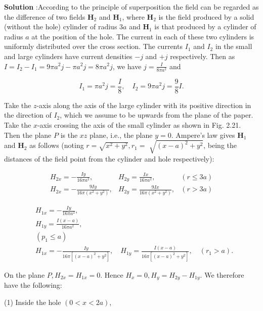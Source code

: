 \documentclass[10pt]{article}
\begin{document}
\textbf{Solution} :According to the principle of superposition the field can be regarded as the difference of two fields $\mathbf{H}_{2}$ and $\mathbf{H}_{1}$, where $\mathbf{H}_{2}$ is the field produced by a solid (without the hole) cylinder of radius $3 a$ and $\mathbf{H}_{1}$ is that produced by a cylinder of radius $a$ at the position of the hole. The current in each of these two cylinders is uniformly distributed over the cross section. The currents $I_{1}$ and $I_{2}$ in the small and large cylinders have current densities $-j$ and $+j$ respectively. Then as $I=I_{2}-I_{1}=9 \pi a^{2} j-\pi a^{2} j=8 \pi a^{2} j$, we have $j=\frac{I}{8 \pi a^{2}}$ and

$$
I_{1}=\pi a^{2} j=\frac{I}{8}, \quad I_{2}=9 \pi a^{2} j=\frac{9}{8} I .
$$

Take the $z$-axis along the axis of the large cylinder with its positive direction in the direction of $I_{2}$, which we assume to be upwards from the plane of the paper. Take the $x$-axis crossing the axis of the small cylinder as shown in Fig. 2.21. Then the plane $P$ is the $x z$ plane, i.e., the plane $y=0$. Ampere's law gives $\mathbf{H}_{1}$ and $\mathbf{H}_{2}$ as follows (noting $r=\sqrt{x^{2}+y^{2}}, r_{1}=$ $\sqrt{(x-a)^{2}+y^{2}}$, being the distances of the field point from the cylinder and hole respectively):

$$
\begin{array}{lll}
H_{2 x}=-\frac{I y}{16 \pi a^{2}}, & H_{2 y}=\frac{I x}{16 \pi a^{2}}, & (r \leq 3 a) \\
H_{2 x}=-\frac{9 I y}{16 \pi\left(x^{2}+y^{2}\right)}, & H_{2 y}=\frac{9 I x}{16 \pi\left(x^{2}+y^{2}\right)}, & (r>3 a)
\end{array}
$$



$$
\begin{aligned}
& H_{1 x}=-\frac{I y}{16 \pi a^{2}}, \\
& H_{1 y}=\frac{I(x-a)}{16 \pi a^{2}} \text {, } \\
& \left(p_{1} \leq a\right) \\
& H_{1 x}=-\frac{I y}{16 \pi\left[(x-a)^{2}+y^{2}\right]}, \quad H_{1 y}=\frac{I(x-a)}{16 \pi\left[(x-a)^{2}+y^{2}\right]}, \quad\left(r_{1}>a\right) .
\end{aligned}
$$

On the plane $P, H_{2 x}=H_{1 x}=0$. Hence $H_{x}=0, H_{y}=H_{2 y}-H_{1 y}$. We therefore have the following:

(1) Inside the hole $(0<x<2 a)$,
\end{document}
